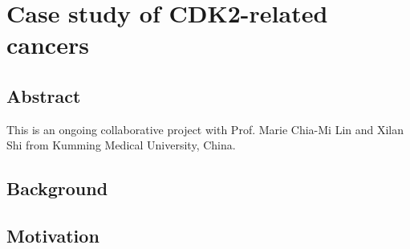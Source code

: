\chapter{Case study of CDK2-related cancers}
\label{cdk2}

\section{Abstract}

This is an ongoing collaborative project with Prof. Marie Chia-Mi Lin and Xilan Shi from Kumming Medical University, China.

\section{Background}




\section{Motivation}



